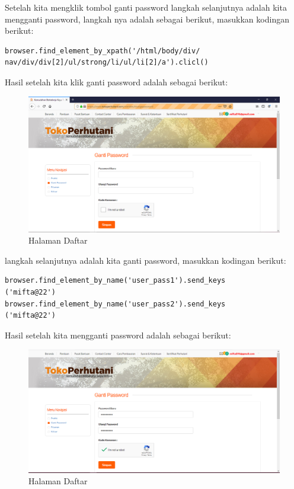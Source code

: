 \newpage
Setelah kita mengklik tombol ganti password langkah selanjutnya adalah kita mengganti password, langkah nya adalah sebagai berikut, masukkan kodingan berikut: 
\begin{verbatim}
browser.find_element_by_xpath('/html/body/div/
nav/div/div[2]/ul/strong/li/ul/li[2]/a').clicl()
\end{verbatim} 

Hasil setelah kita klik ganti password adalah sebagai berikut: 
\begin{figure}[h]
	\centering
	\includegraphics[scale=0.25]{figures/2GantiPassword}
	\caption{Halaman Daftar}
\end{figure}

langkah selanjutnya adalah kita ganti password, masukkan kodingan berikut: 
\begin{verbatim}
browser.find_element_by_name('user_pass1').send_keys
('mifta@22')
browser.find_element_by_name('user_pass2').send_keys
('mifta@22')
\end{verbatim}

Hasil setelah kita mengganti password adalah sebagai berikut: 
\begin{figure}[h]
	\centering
	\includegraphics[scale=0.25]{figures/3GantiPassword}
	\caption{Halaman Daftar}
\end{figure}



